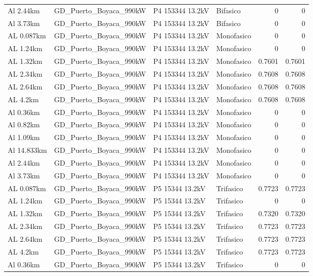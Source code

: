 \documentclass[11pt,a4paper]{article}
\begin{document}
\begin{longtable}{llllrr}
Al 2.44km & GD\_Puerto\_Boyaca\_990kW & P4 153344 13.2kV & Bifasico & 0 & 0 \\
Al 3.73km & GD\_Puerto\_Boyaca\_990kW & P4 153344 13.2kV & Bifasico & 0 & 0 \\
AL 0.087km & GD\_Puerto\_Boyaca\_990kW & P4 153344 13.2kV & Monofasico & 0 & 0 \\
AL 1.24km & GD\_Puerto\_Boyaca\_990kW & P4 153344 13.2kV & Monofasico & 0 & 0 \\
AL 1.32km & GD\_Puerto\_Boyaca\_990kW & P4 153344 13.2kV & Monofasico & 0.7601 & 0.7601 \\
AL 2.34km & GD\_Puerto\_Boyaca\_990kW & P4 153344 13.2kV & Monofasico & 0.7608 & 0.7608 \\
AL 2.64km & GD\_Puerto\_Boyaca\_990kW & P4 153344 13.2kV & Monofasico & 0.7608 & 0.7608 \\
AL 4.2km & GD\_Puerto\_Boyaca\_990kW & P4 153344 13.2kV & Monofasico & 0.7608 & 0.7608 \\
Al 0.36km & GD\_Puerto\_Boyaca\_990kW & P4 153344 13.2kV & Monofasico & 0 & 0 \\
Al 0.82km & GD\_Puerto\_Boyaca\_990kW & P4 153344 13.2kV & Monofasico & 0 & 0 \\
Al 1.09km & GD\_Puerto\_Boyaca\_990kW & P4 153344 13.2kV & Monofasico & 0 & 0 \\
Al 14.833km & GD\_Puerto\_Boyaca\_990kW & P4 153344 13.2kV & Monofasico & 0 & 0 \\
Al 2.44km & GD\_Puerto\_Boyaca\_990kW & P4 153344 13.2kV & Monofasico & 0 & 0 \\
Al 3.73km & GD\_Puerto\_Boyaca\_990kW & P4 153344 13.2kV & Monofasico & 0 & 0 \\
AL 0.087km & GD\_Puerto\_Boyaca\_990kW & P5 15344 13.2kV & Trifasico & 0.7723 & 0.7723 \\
AL 1.24km & GD\_Puerto\_Boyaca\_990kW & P5 15344 13.2kV & Trifasico & 0 & 0 \\
AL 1.32km & GD\_Puerto\_Boyaca\_990kW & P5 15344 13.2kV & Trifasico & 0.7320 & 0.7320 \\
AL 2.34km & GD\_Puerto\_Boyaca\_990kW & P5 15344 13.2kV & Trifasico & 0.7723 & 0.7723 \\
AL 2.64km & GD\_Puerto\_Boyaca\_990kW & P5 15344 13.2kV & Trifasico & 0.7723 & 0.7723 \\
AL 4.2km & GD\_Puerto\_Boyaca\_990kW & P5 15344 13.2kV & Trifasico & 0.7723 & 0.7723 \\
Al 0.36km & GD\_Puerto\_Boyaca\_990kW & P5 15344 13.2kV & Trifasico & 0 & 0 \\

\end{longtable}
\end{document}
